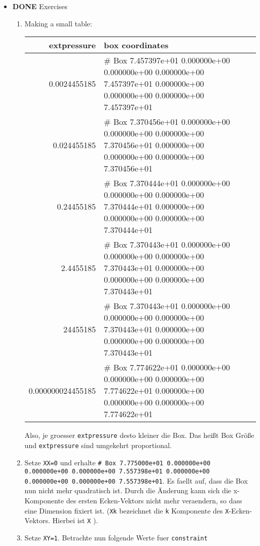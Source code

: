 \documentclass[11pt]{article}
\begin{document}
\begin{itemize}

\item \textbf{DONE} Exercises\\
\label{sec-2.4.5.1}

\begin{enumerate}
\item Making a small table: 

\begin{center}
\begin{tabular}{rl}
       extpressure  &  box coordinates                                                                                                                                         \\
\hline
      0.0024455185  &  \# Box    7.457397e+01    0.000000e+00    0.000000e+00    0.000000e+00    7.457397e+01    0.000000e+00    0.000000e+00    0.000000e+00    7.457397e+01  \\
       0.024455185  &  \# Box   7.370456e+01    0.000000e+00    0.000000e+00    0.000000e+00    7.370456e+01    0.000000e+00    0.000000e+00    0.000000e+00    7.370456e+01   \\
        0.24455185  &  \# Box   7.370444e+01    0.000000e+00    0.000000e+00    0.000000e+00    7.370444e+01    0.000000e+00    0.000000e+00    0.000000e+00    7.370444e+01   \\
         2.4455185  &  \# Box   7.370443e+01    0.000000e+00    0.000000e+00    0.000000e+00    7.370443e+01    0.000000e+00    0.000000e+00    0.000000e+00    7.370443e+01   \\
          24455185  &  \# Box   7.370443e+01    0.000000e+00    0.000000e+00    0.000000e+00    7.370443e+01    0.000000e+00    0.000000e+00    0.000000e+00    7.370443e+01   \\
 0.000000024455185  &  \# Box  7.774622e+01    0.000000e+00    0.000000e+00    0.000000e+00    7.774622e+01    0.000000e+00    0.000000e+00    0.000000e+00    7.774622e+01    \\
\end{tabular}
\end{center}


   Also, je groesser \texttt{extpressure} desto kleiner die Box. Das heißt Box Größe und \texttt{extpressure} sind umgekehrt proportional.
\item Setze \texttt{XX=0} und erhalte \texttt{\# Box  7.775000e+01    0.000000e+00    0.000000e+00    0.000000e+00    7.557398e+01    0.000000e+00    0.000000e+00    0.000000e+00    7.557398e+01}. 
   Es faellt auf, dass die Box nun nicht mehr quadratisch ist. Durch die Änderung kann sich die x-Komponente des ersten Ecken-Vektors nicht mehr veraendern, so dass eine Dimension fixiert ist. (\texttt{Xk} bezeichnet die \texttt{k} Komponente des \texttt{X}-Ecken-Vektors. Hierbei ist \texttt{X} ).
\item Setze \texttt{XY=1}. Betrachte nun folgende Werte fuer \texttt{constraint}


\end{enumerate}
\end{itemize}
\end{document}
